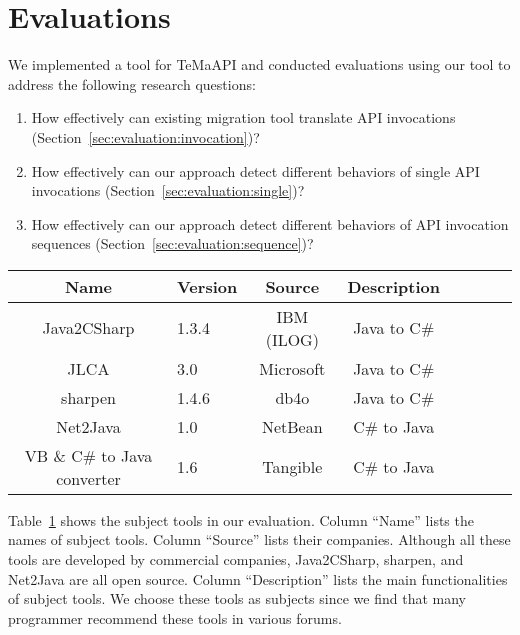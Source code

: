 \section{Evaluations}
\label{sec:evaluation}

We implemented a tool for TeMaAPI and
conducted evaluations using our tool to address the following
research questions:

\begin{enumerate}
\item How effectively can existing migration tool translate API invocations (Section~\ref{sec:evaluation:invocation})? \vspace*{-1.8ex}
\item How effectively can our approach detect different behaviors of single API invocations (Section~\ref{sec:evaluation:single})? \vspace*{-1.8ex}
\item How effectively can our approach detect different behaviors of API invocation sequences (Section~\ref{sec:evaluation:sequence})? 
\end{enumerate}%

\begin{table}[t]
\centering
\begin{SmallOut}
\begin {tabular} {|c|l|c|c|c|c|c|c|}
 \hline
\textbf{Name}& \textbf{Version}& \textbf{Source} &\textbf{Description}\\
\hline
Java2CSharp  &  1.3.4 & IBM (ILOG) & Java to C\# \\
\hline
JLCA         &  3.0   & Microsoft  & Java to C\# \\
\hline
sharpen      &  1.4.6 & db4o       & Java to C\# \\
\hline
Net2Java     &  1.0   & NetBean    &  C\# to Java\\
\hline
VB \& C\# to Java converter    &  1.6   & Tangible   &  C\# to Java\\
\hline
\end{tabular}\vspace*{-2ex}
 \label{table:subjects}
\end{SmallOut}\vspace*{-2ex}
\end{table}

Table~\ref{table:subjects} shows the subject tools in our evaluation. Column ``Name'' lists the names of subject tools. Column ``Source'' lists their companies. Although all these tools are developed by commercial companies, Java2CSharp, sharpen, and Net2Java are all open source. Column ``Description'' lists the main functionalities of subject tools. We choose these tools as subjects since we find that many programmer recommend these tools in various forums.

